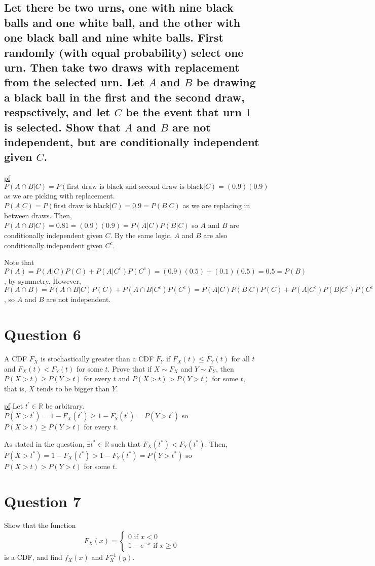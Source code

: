 \documentclass[11pt]{article} %
\begin{document}
\subsection{Let there be two urns, one with nine black balls and one white ball, and the other with one black ball and nine white balls. First randomly (with equal probability) select one urn. Then take two draws with replacement from the selected urn. Let $A$ and $B$ be drawing a black ball in the first and the second draw, respsctively, and let $C$ be the event that urn $1$ is selected. Show that $A$ and $B$ are not independent, but are conditionally independent given $C$.}

\underline{pf} $P(A\cap B|C) = P(\text{first draw is black and second draw is black}|C) = (0.9)(0.9)$ as we are picking with replacement. $P(A|C)= P(\text{first draw is black}|C) = 0.9 = P(B|C)$ as we are replacing in between draws. Then, $P(A \cap B |C) = 0.81 = (0.9)(0.9) = P(A|C)P(B|C)$ so $A$ and $B$ are conditionally independent given $C$. By the same logic, $A$ and $B$ are also conditionally independent given $C^{c}$.

Note that $P(A) = P(A|C)P(C) +P(A|C^{c})P(C^{c}) = (0.9)(0.5) + (0.1)(0.5) = 0.5 = P(B)$, by symmetry. However, $P(A \cap B) = P(A \cap B|C) P(C) + P(A \cap B|C^{c})P(C^{c}) = P(A|C)P(B|C)P(C) + P(A|C^{c})P(B|C^{c})P(C^{c}) = (0.9)(0.9)(0.5) + (0.1)(0.1)(0.5) = 0.41 \neq 0.25 = (0.5)(0.5) = P(A)P(B)$, so $A$ and $B$ are not independent.

\section{Question 6}
A CDF $F_X$ is stochastically greater than a CDF $F_Y$ if $ F_X(t) \leq F_Y(t)$ for all $t$ and $F_X(t) < F_Y(t)$ for some $t$. Prove that if $X\sim F_X$ and $Y\sim F_Y$, then $P(X>t) \geq P(Y>t)$ for every $t$ and $P(X>t)>P(Y>t)$ for some $t$, that is, $X$ tends to be bigger than $Y$.

\underline{pf} Let $t^{'} \in \mathbb{R}$ be arbitrary. $P(X>t^{'}) = 1 - F_X(t^{'}) \geq 1 - F_Y(t^{'}) = P(Y>t^{'})$ so $P(X>t) \geq P(Y>t)$ for every $t$. 

As stated in the question, $\exists t^{*} \in \mathbb{R}$ such that $F_X(t^{*} ) < F_Y(t^{*} )$. Then, $P(X>t^{*}) = 1 - F_X(t^{*}) > 1 - F_Y(t^{*}) = P(Y>t^{*})$ so $P(X>t)>P(Y>t)$ for some $t$.

\section{Question 7}
Show that the function
\begin{equation*}
F_X(x) = 
\begin{cases}
0 \text{ if $x <0$} \\
1 - e^{-x} \text{ if $x\geq 0$}
\end{cases}
\end{equation*}
is a CDF, and find $f_X(x)$ and $F_{X}^{-1}(y)$.
\end{document}
